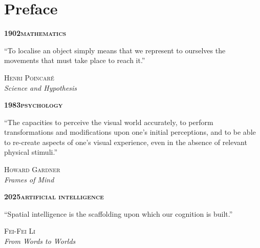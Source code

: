 \clearpage
\chapter*{Preface}

\newcommand{\quotecardhead}[2]{{\normalfont\scriptsize\bfseries\color{quoteaccent}#1\enspace\textperiodcentered\enspace\textsc{#2}}\par\vspace{2pt}}
\vspace{-4mm}
\begin{tcbraster}[raster columns=3, raster equal height, raster column skip=3mm]
\begin{tcolorbox}[quotecard]
\quotecardhead{1902}{mathematics}
``To localise an object simply means that we represent to ourselves the movements that must take place to reach it.''
\tcblower
{\normalfont\footnotesize\textsc{Henri Poincar\'{e}}\\\textit{Science and Hypothesis}\strut}
\end{tcolorbox}
\begin{tcolorbox}[quotecard]
\quotecardhead{1983}{psychology}
``The capacities to perceive the visual world accurately, to perform transformations and modifications upon one's initial perceptions, and to be able to re-create aspects of one's visual experience, even in the absence of relevant physical stimuli.''
\tcblower
{\normalfont\footnotesize\textsc{Howard Gardner}\\\textit{Frames of Mind}\strut}
\end{tcolorbox}
\begin{tcolorbox}[quotecard]
\quotecardhead{2025}{artificial intelligence}
``Spatial intelligence is the scaffolding upon which our cognition is built.''
\tcblower
{\normalfont\footnotesize\textsc{Fei-Fei Li}\\\textit{From Words to Worlds}\strut}
\end{tcolorbox}
\end{tcbraster}
\vspace{5mm}


